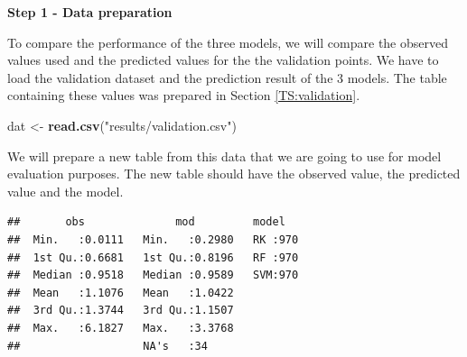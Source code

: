 \documentclass[10pt,b5paper,]{book}
\newenvironment{Shaded}{\begin{snugshade}}{\end{snugshade}}
\newcommand{\CommentTok}[1]{\textcolor[rgb]{0.56,0.35,0.01}{\textit{#1}}}
\newcommand{\DataTypeTok}[1]{\textcolor[rgb]{0.13,0.29,0.53}{#1}}
\newcommand{\KeywordTok}[1]{\textcolor[rgb]{0.13,0.29,0.53}{\textbf{#1}}}
\newcommand{\NormalTok}[1]{#1}
\newcommand{\OperatorTok}[1]{\textcolor[rgb]{0.81,0.36,0.00}{\textbf{#1}}}
\newcommand{\StringTok}[1]{\textcolor[rgb]{0.31,0.60,0.02}{#1}}
\theoremstyle{definition}
\theoremstyle{definition}
\theoremstyle{definition}
\theoremstyle{remark}
\begin{document}
\textbf{Step 1 - Data preparation}

To compare the performance of the three models, we will compare the
observed values used and the predicted values for the the validation
points. We have to load the validation dataset and the prediction result
of the 3 models. The table containing these values was prepared in
Section \ref{TS:validation}.

\begin{Shaded}
\begin{Highlighting}[]
\NormalTok{dat <-}\StringTok{ }\KeywordTok{read.csv}\NormalTok{(}\StringTok{"results/validation.csv"}\NormalTok{)}
\end{Highlighting}
\end{Shaded}

We will prepare a new table from this data that we are going to use for
model evaluation purposes. The new table should have the observed value,
the predicted value and the model.

\begin{Shaded}
\end{Shaded}

\begin{verbatim}
##       obs              mod         model    
##  Min.   :0.0111   Min.   :0.2980   RK :970  
##  1st Qu.:0.6681   1st Qu.:0.8196   RF :970  
##  Median :0.9518   Median :0.9589   SVM:970  
##  Mean   :1.1076   Mean   :1.0422            
##  3rd Qu.:1.3744   3rd Qu.:1.1507            
##  Max.   :6.1827   Max.   :3.3768            
##                   NA's   :34
\end{verbatim}
\end{document}
